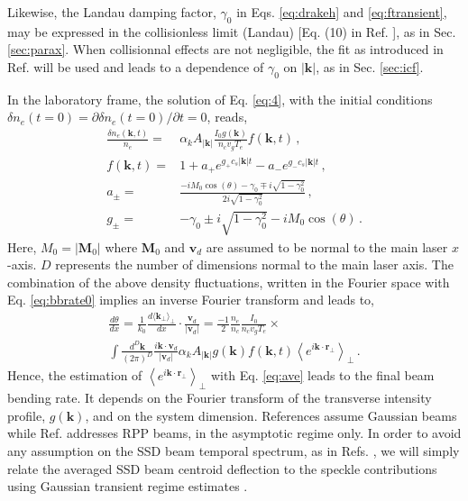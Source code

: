 \documentclass[%
 reprint,
 amsmath,amssymb,
 aps,
]{revtex4-1}
\begin{document}
%
Likewise, the Landau damping factor, $\gamma_0$ in Eqs. \eqref{eq:drakeh} and \eqref{eq:ftransient}, may be expressed in the collisionless limit (Landau) [Eq. (10) in Ref. \cite{POP_Ruyer_2020}], as in Sec. \ref{sec:parax}.
When collisionnal effects are not negligible, the fit as introduced in Ref. \cite[]{LPB_casanova_1989} will be used and leads to a dependence of $\gamma_0$ on $\vert \mathbf{k}\vert $, as in Sec. \ref{sec:icf}.

In the laboratory frame, the solution of Eq. \eqref{eq:4}, with the initial conditions $\delta n_e(t=0)=\partial \delta n_e(t=0)/\partial t = 0$, reads,  
\begin{align}
    \frac{\delta n_e(\mathbf{k},t)}{n_e} = &\alpha_k A_{\vert \mathbf{k}\vert}\frac{I_0 g(\mathbf{k})  }{n_cv_gT_e} f(\mathbf{k},t)\, , \\
    f(\mathbf{k},t)=&1+a_+e^{g_+c_s\vert\mathbf{k}\vert t}- a_-e^{g_-c_s \vert\mathbf{k} \vert t}\, , \label{eq:ftransient} \\
    a_\pm =&\frac{-iM_0\cos(\theta) -\gamma_0\mp i\sqrt{1-\gamma_0^2}}{2i\sqrt{1-\gamma_0^2}} \, , \\
    g_\pm =& -\gamma_0\pm i\sqrt{1-\gamma_0^2} -iM_0 \cos(\theta) \, .
\end{align}
Here, $M_0=\vert \mathbf{M}_0\vert $ where $\mathbf{M}_0$ and $ \mathbf{v}_d$ are assumed to be normal to the main laser $x$-axis. $D$ represents the number of dimensions normal to the main laser axis. The combination of the above density fluctuations, written in the Fourier space  with Eq. \eqref{eq:bbrate0}   implies an inverse Fourier transform and leads to,
\begin{align}
  \frac{d\theta }{dx}= \frac{1}{k_0} \frac{d \langle \mathbf{k}_\perp \rangle_\perp    }{d x} \cdot \frac{ \mathbf{v}_d }{ \vert \mathbf{v}_d \vert }
=\frac{-1}{2}\frac{n_e}{n_c} \frac{I_0 }{n_cv_gT_e} \times \nonumber \\
 \int \frac{d^D \mathbf{k}}{(2\pi)^D} \frac{ i \mathbf{k}\cdot\mathbf{v}_d }{\vert \mathbf{v}_d \vert} \alpha_k A_{\vert \mathbf{k}\vert}g(\mathbf{k})  f(\mathbf{k},t)\left\langle  e^{i \mathbf{k}\cdot  \mathbf{r}_\perp}\right\rangle_\perp\, . \label{eq:bb1}
\end{align}
Hence, the estimation of $\left\langle e^{i \mathbf{k}\cdot  \mathbf{r}_\perp}\right\rangle_\perp$ with Eq. \eqref{eq:ave} leads to the final beam bending rate. It depends on the Fourier transform of the  transverse intensity profile, $g(\mathbf{k})$, and on the system dimension. 
References  \cite[]{POP_Rose_96,POP_Hinkel_1998} assume Gaussian beams while Ref. \cite[]{POP_Rose_97} addresses RPP beams, in the asymptotic regime only.  
In order to avoid any assumption on the SSD beam temporal spectrum, as in Refs. \cite[]{POP_Ghosal_1997,POP_Rose_Ghosal_98}, 
 we will simply  relate the averaged SSD beam centroid deflection to the speckle  contributions using  Gaussian transient regime estimates \cite[]{POP_Ruyer_2020}.
\end{document}
